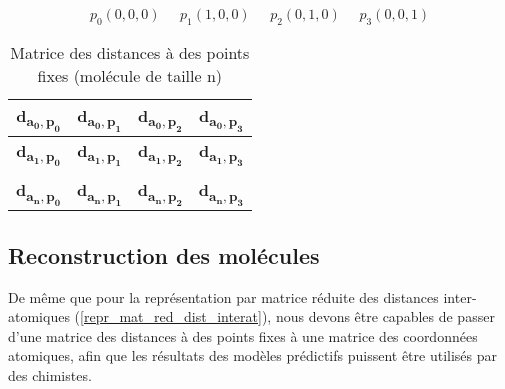 \begin{equation}
		p_0(0, 0, 0) \; \; \; \; \; 
		p_1(1, 0, 0) \; \; \; \; \; 
		p_2(0, 1, 0) \: \; \; \; \; 
		p_3(0, 0, 1)
		\label{eq_pts_fixes}
\end{equation}

\begin{table}
	\centering
	
	\begin{tabular}{|c|c|c|c|}
		\hline
		\textbf{d\textsubscript{$\mathbf{a_0,p_0}$}} & \textbf{d\textsubscript{$\mathbf{a_0,p_1}$}} & \textbf{d\textsubscript{$\mathbf{a_0,p_2}$}} & \textbf{d\textsubscript{$\mathbf{a_0,p_3}$}} \\ \hline
		\textbf{d\textsubscript{$\mathbf{a_1,p_0}$}} & \textbf{d\textsubscript{$\mathbf{a_1,p_1}$}} & \textbf{d\textsubscript{$\mathbf{a_1,p_2}$}} & \textbf{d\textsubscript{$\mathbf{a_1,p_3}$}} \\ \hline
		\rot{... } & \rot{... } & \rot{... } & \rot{... } \\ \hline
		\textbf{d\textsubscript{$\mathbf{a_n,p_0}$}} & \textbf{d\textsubscript{$\mathbf{a_n,p_1}$}} & \textbf{d\textsubscript{$\mathbf{a_n,p_2}$}} & \textbf{d\textsubscript{$\mathbf{a_n,p_3}$}} \\ \hline
	\end{tabular}
	
	\caption{Matrice des distances à des points fixes (molécule de taille n)}
	\label{table_mat_pts_fixes}
\end{table}


\subsection{Reconstruction des molécules}

\label{repr_mat_pts_fixes_reconstruct}

\par De même que pour la représentation par matrice réduite des distances inter-atomiques (\ref{repr_mat_red_dist_interat}), nous devons être capables de passer d'une matrice des distances à des points fixes à une matrice des coordonnées atomiques, afin que les résultats des modèles prédictifs puissent être utilisés par des chimistes.\\


